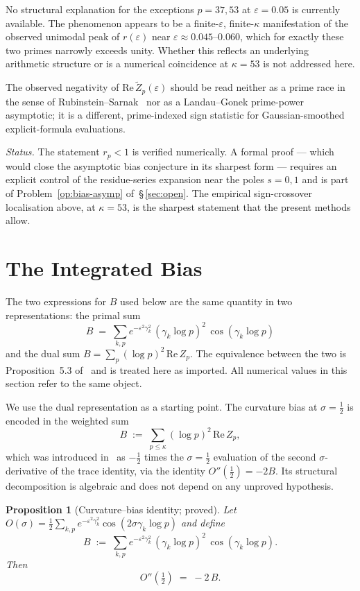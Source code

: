 \documentclass[11pt]{article}
\newtheorem{proposition}[theorem]{Proposition}
\newcommand{\Zt}{\widetilde{Z}}
\begin{document}
No structural explanation for the exceptions $p=37,53$ at
$\varepsilon=0.05$ is currently available.
The phenomenon appears to be a finite-$\varepsilon$, finite-$\kappa$
manifestation of the observed unimodal peak of $r(\varepsilon)$ near
$\varepsilon\approx 0.045$--$0.060$, which for exactly these two
primes narrowly exceeds unity.
Whether this reflects an underlying arithmetic structure or is a
numerical coincidence at $\kappa=53$ is not addressed here.

The observed negativity of $\mathrm{Re}\,\Zt_p(\varepsilon)$ should
be read neither as a prime race in the sense of
Rubinstein--Sarnak~\cite{RubinsteinSarnak} nor as a Landau--Gonek
prime-power asymptotic; it is a different, prime-indexed sign
statistic for Gaussian-smoothed explicit-formula evaluations.

\emph{Status.}
The statement $r_p<1$ is verified numerically.
A formal proof --- which would close the asymptotic bias conjecture in
its sharpest form --- requires an explicit control of the
residue-series expansion near the poles $s=0,1$ and is part of
Problem~\ref{op:bias-asymp} of~\S\,\ref{sec:open}.
The empirical sign-crossover localisation above, at $\kappa=53$, is
the sharpest statement that the present methods allow.

\section{The Integrated Bias}
\label{sec:intbias}

The two expressions for $B$ used below are the same quantity in two
representations: the primal sum
\[
B \;=\; \sum_{k,p} e^{-\varepsilon^2\gamma_k^2}\,(\gamma_k\log p)^2\,
         \cos(\gamma_k\log p)
\]
and the dual sum $B=\sum_p(\log p)^2\,\mathrm{Re}\,Z_p$.
The equivalence between the two is Proposition~5.3 of~\cite{Paper5}
and is treated here as imported.
All numerical values in this section refer to the same object.

We use the dual representation as a starting point.
The curvature bias at $\sigma=\tfrac12$ is encoded in the weighted sum
\[
B \;:=\; \sum_{p\le\kappa}(\log p)^2\,\mathrm{Re}\,Z_p,
\]
which was introduced in~\cite{Paper5} as $-\tfrac12$ times the
$\sigma=\tfrac12$ evaluation of the second $\sigma$-derivative of the
trace identity, via the identity $O''(\tfrac12)=-2B$.
Its structural decomposition is algebraic and does not depend on any
unproved hypothesis.

\begin{proposition}[Curvature--bias identity; proved]
\label{prop:curv-bias}
Let $O(\sigma)=\tfrac12\sum_{k,p} e^{-\varepsilon^2\gamma_k^2}
\cos(2\sigma\gamma_k\log p)$ and define
\[
B \;:=\; \sum_{k,p} e^{-\varepsilon^2\gamma_k^2}\,(\gamma_k\log p)^2\,
         \cos(\gamma_k\log p).
\]
Then
\[
O''(\tfrac12) \;=\; -2\,B.
\]
\end{proposition}
\end{document}
